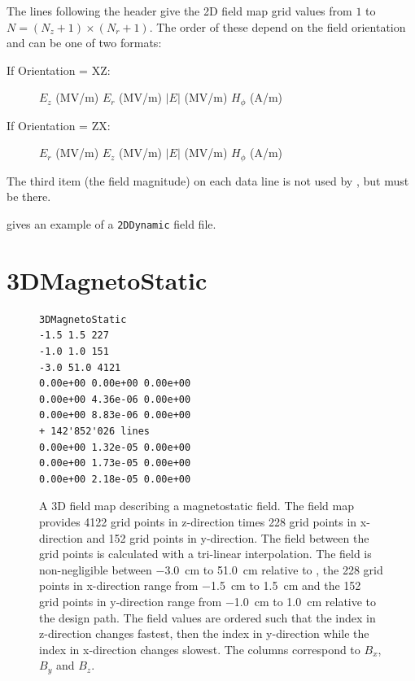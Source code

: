 The lines following the header give the 2D field map grid values from $1$ to $N= (N_{z} + 1) \times (N_{r} + 1)$. The
order of these depend on the field orientation  and can be one of two formats:
\begin{description}
\item[If Orientation = XZ:] $E_{z}$ (MV/m) $E_{r}$ (MV/m) $|E|$ (MV/m) $H_{\phi}$ (A/m)
\item[If Orientation = ZX:] $E_{r}$ (MV/m) $E_{z}$ (MV/m) $|E|$ (MV/m) $H_{\phi}$ (A/m)
\end{description}
The third item (the field magnitude) on each data line is not used by \opalt, but must be there.

 gives an example of a \texttt{2DDynamic} field file.
\section{3DMagnetoStatic}
\label{sec:3DMagnetoStatic}
\begin{figure}[h]
  \begin{fmpage}
\begin{verbatim}
3DMagnetoStatic
-1.5 1.5 227
-1.0 1.0 151
-3.0 51.0 4121
0.00e+00 0.00e+00 0.00e+00
0.00e+00 4.36e-06 0.00e+00
0.00e+00 8.83e-06 0.00e+00
+ 142'852'026 lines
0.00e+00 1.32e-05 0.00e+00
0.00e+00 1.73e-05 0.00e+00
0.00e+00 2.18e-05 0.00e+00
\end{verbatim}
  \end{fmpage}
  \caption[Example of a 3DMagnetoStatic field map]{A 3D field map describing a magnetostatic field.
    The field map provides 4122 grid points in z-direction times 228 grid points in x-direction and 152 grid points in y-direction.
    The field between the grid points is calculated with a tri-linear interpolation. The field is non-negligible between \SI{-3.0}{\centi\meter}
    to \SI{51.0}{\centi\meter} relative to , the 228 grid points in x-direction range from \SI{-1.5}{\centi\meter} to \SI{1.5}{\centi\meter} and the 152 grid
    points in y-direction range from \SI{-1.0}{\centi\meter} to \SI{1.0}{\centi\meter} relative to the design path. The field values are ordered such that the index in z-direction changes fastest, then the index in y-direction while the index in x-direction changes
    slowest. The columns correspond to $B_x$, $B_y$ and $B_z$.}
  \label{fig:3DMagnetoStatic}
\end{figure}

